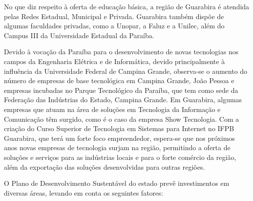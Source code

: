 
No que diz respeito à oferta de educação básica, a região de Guarabira é atendida pelas Redes Estadual, Municipal e Privada. Guarabira também dispõe de algumas faculdades privadas, como a Unopar, a Faluz e a Unilec, além do Campus III da Universidade Estadual da Paraíba.

Devido à vocação da Paraíba para o desenvolvimento de novas tecnologias nos campos da Engenharia Elétrica e de Informática, devido principalmente à influência da Universidade Federal de Campina Grande, observa-se o aumento do número de empresas de base tecnológica em Campina Grande, João Pessoa e empresas incubadas no Parque Tecnológico da Paraíba, que tem como sede da Federação das Indústrias do Estado, Campina Grande. Em Guarabira, algumas empresas que atuam na área de soluções em Tecnologia da Informação e Comunicação têm surgido, como é o caso da empresa Show Tecnologia. Com a criação do Curso Superior de Tecnologia em Sistemas para Internet no IFPB Guarabira, que terá um forte foco empreendedor, espera-se que nos próximos anos novas empresas de tecnologia surjam na região, permitindo a oferta de soluções e serviços para as indústrias locais e para o forte comércio da região, além da exportação das soluções desenvolvidas para outras regiões.


O Plano de Desenvolvimento Sustentável do estado prevê investimentos em diversas áreas, levando em conta os seguintes fatores:

